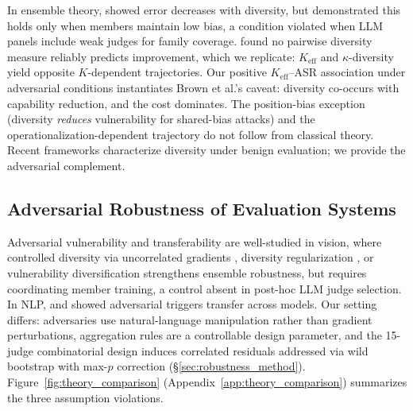 In ensemble theory, \citet{krogh1995neural} showed error decreases with diversity, but \citet{brown2005managing} demonstrated this holds only when members maintain low bias, a condition violated when LLM panels include weak judges for family coverage. \citet{kuncheva2003measures} found no pairwise diversity measure reliably predicts improvement, which we replicate: $K_{\mathrm{eff}}$ and $\kappa$-diversity yield opposite $K$-dependent trajectories. Our positive $K_{\mathrm{eff}}$--ASR association under adversarial conditions instantiates Brown et al.'s caveat: diversity co-occurs with capability reduction, and the cost dominates. The position-bias exception (diversity \emph{reduces} vulnerability for shared-bias attacks) and the operationalization-dependent trajectory do not follow from classical theory. Recent frameworks \citep{yang2026diversity,turkmen2026ensemble} characterize diversity under benign evaluation; we provide the adversarial complement.

\subsection{Adversarial Robustness of Evaluation Systems}

Adversarial vulnerability \citep{goodfellow2015adversarial} and transferability \citep{papernot2016transferability} are well-studied in vision, where controlled diversity via uncorrelated gradients \citep{kariyappa2019improving}, diversity regularization \citep{pang2019improving}, or vulnerability diversification \citep{zhu2020dverge} strengthens ensemble robustness, but requires coordinating member training, a control absent in post-hoc LLM judge selection. In NLP, \citet{wallace2019universal} and \citet{zou2023universal} showed adversarial triggers transfer across models. Our setting differs: adversaries use natural-language manipulation rather than gradient perturbations, aggregation rules are a controllable design parameter, and the 15-judge combinatorial design induces correlated residuals addressed via wild bootstrap \citep{mackinnon2018wild} with max-$p$ correction (\S\ref{sec:robustness_method}). Figure~\ref{fig:theory_comparison} (Appendix~\ref{app:theory_comparison}) summarizes the three assumption violations.
